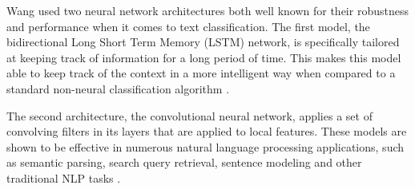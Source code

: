 Wang used two neural network architectures both well known for their robustness and performance when it comes to text classification. 
The first model, the bidirectional Long Short Term Memory (LSTM) network, is specifically tailored at keeping track of information for a long period of time. 
This makes this model able to keep track of the context in a more intelligent way when compared to a standard non-neural classification algorithm \cite{olah2015}. 

The second architecture, the convolutional neural network, applies a set of convolving filters in its layers that are applied to local features. 
These models are shown to be effective in numerous natural language processing applications, such as semantic parsing, search query retrieval, sentence modeling and other traditional NLP tasks \cite{kim2014}.  